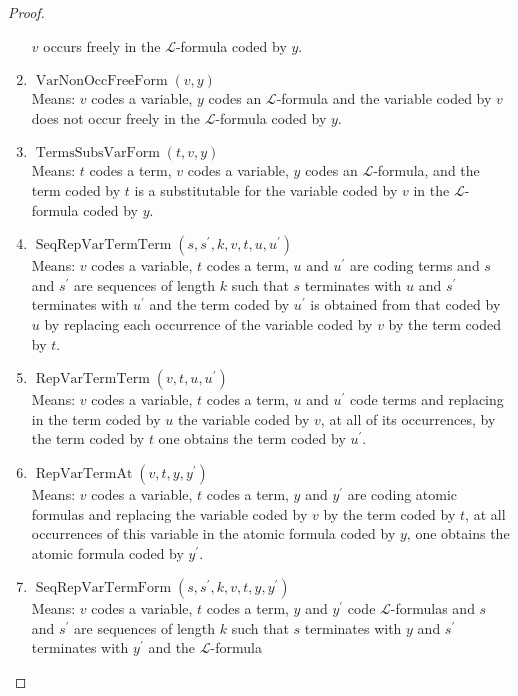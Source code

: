 \begin{proof}
\begin{enumerate}
        $v$ occurs freely in the $\mathcal{L}$-formula coded by $y$.
        \item $\operatorname{VarNonOccFreeForm}(v,y)$\\
        Means: $v$ codes a variable, $y$ codes an $\mathcal{L}$-formula and the variable coded by
        $v$ does not occur freely in the $\mathcal{L}$-formula coded by $y$.
        \item $\operatorname{TermsSubsVarForm}(t,v,y)$\\
        Means: $t$ codes a term, $v$ codes a variable, $y$ codes an $\mathcal{L}$-formula, and
        the term coded by $t$ is a substitutable for the variable coded by $v$ in the 
        $\mathcal{L}$-formula coded by $y$.
        \item $\operatorname{SeqRepVarTermTerm}(s, s^\prime, k, v, t, u, u^\prime)$\\
        Means: $v$ codes a variable, $t$ codes a term, $u$ and $u^\prime$ are coding terms 
        and $s$ and $s^\prime$ are sequences of length $k$ such that $s$ terminates with $u$ 
        and $s^\prime$ terminates with $u^\prime$ and the term coded by $u^\prime$ is obtained from 
        that coded by $u$ by replacing each occurrence of the variable coded by $v$ by the term 
        coded by $t$.
        \item $\operatorname{RepVarTermTerm}(v, t, u, u^\prime)$\\
        Means: $v$ codes a variable, $t$ codes a term, $u$ and $u^\prime$ code terms and 
        replacing in the term coded by $u$ the variable coded by $v$, at all of its occurrences, 
        by the term coded by $t$ one obtains the term coded by $u^\prime$.
        \item $\operatorname{RepVarTermAt}(v, t, y, y^\prime)$\\
        Means: $v$ codes a variable, $t$ codes a term, $y$ and $y^\prime$ are coding atomic formulas 
        and replacing the variable coded by $v$ by the term coded by $t$, 
        at all occurrences of this variable in the atomic formula coded by $y$, 
        one obtains the atomic formula coded by $y^\prime$.
        \item $\operatorname{SeqRepVarTermForm}(s, s^\prime, k, v, t, y, y^\prime)$\\
        Means: $v$ codes a variable, $t$ codes a term, $y$ and $y^\prime$ code 
        $\mathcal{L}$-formulas and $s$ and $s^\prime$ are sequences of length $k$ such that $s$ 
        terminates with $y$ and $s^\prime$ terminates with $y^\prime$ and the $\mathcal{L}$-formula

\end{enumerate}
\end{proof}
